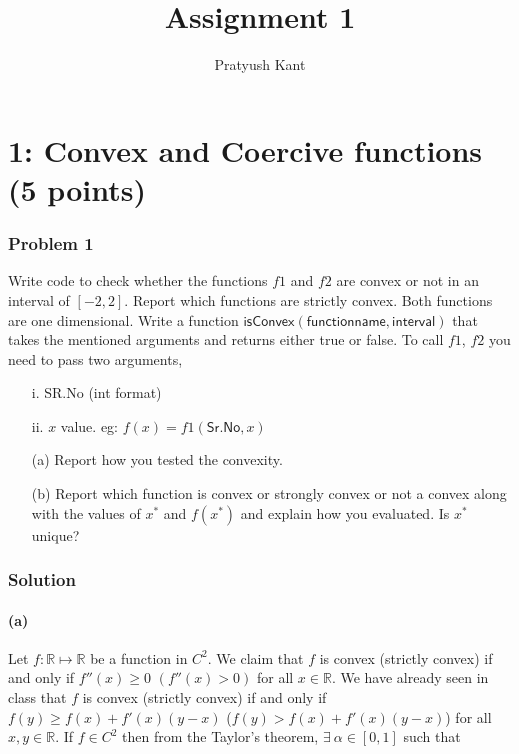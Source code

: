 \documentclass{article}
\begin{document}
\title{Assignment 1}


\author{Pratyush Kant}

\maketitle

\part*{1: Convex and Coercive functions (5 points)}

\section*{Problem 1}

Write code to check whether the functions $f1$ and $f2$ are convex or not in an interval of $[-2,2]$. Report which functions are strictly convex. Both functions are one dimensional. Write a function $\mathsf{isConvex(function name, interval)}$ that takes the mentioned arguments and returns either true or false. To call $f1$, $f2$ you need to pass two arguments,
\begin{itemize}
    \item[i.] SR.No (int format)
    \item[ii.] $x$ value. eg: $f(x) = f1(\mathsf{Sr.No}, x)$
\end{itemize}

\begin{enumerate}
    \item[(a)] Report how you tested the convexity.
    \item[(b)] Report which function is convex or strongly convex or not a convex along with the values of $x^*$ and $f(x^*)$ and explain how you evaluated. Is $x^*$ unique?
\end{enumerate}

\section*{Solution}

\subsection*{(a)}

Let $f: \mathbb{R} \mapsto \mathbb{R}$ be a function in $C^2$. We claim that $f$ is convex (strictly convex) if and only if $f''(x) \geq  0$ $(f''(x) > 0)$ for all $x \in \mathbb{R}$. We have already seen in class that $f$ is convex (strictly convex) if and only if $f(y) \geq f(x) + f'(x) (y - x)$ ($f(y) > f(x) + f'(x) (y - x)$) for all $x, y \in \mathbb{R}$. If $f \in C^2$ then from the Taylor's theorem, $\exists\ \alpha \in [0, 1]$ such that
\end{document}
